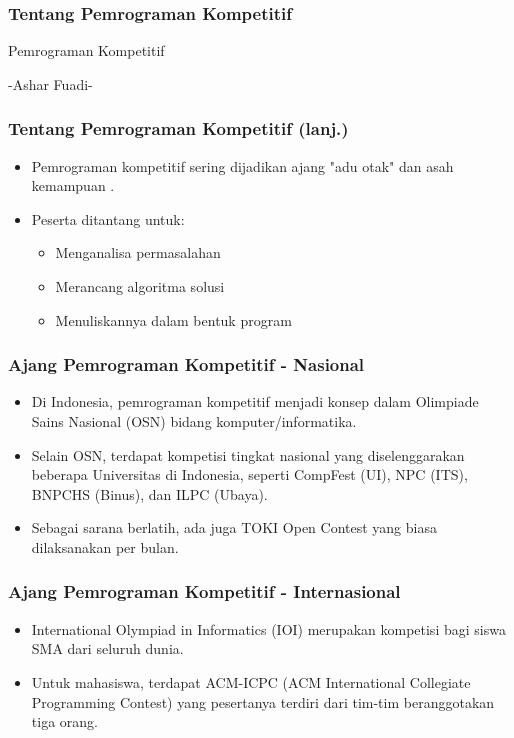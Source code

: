 \begin{frame}
\frametitle{Tentang Pemrograman Kompetitif}
\begin{block}{Pemrograman Kompetitif}

-Ashar Fuadi-
\end{block}
\end{frame}

\begin{frame}
\frametitle{Tentang Pemrograman Kompetitif (lanj.)}
\begin{itemize}
  \item Pemrograman kompetitif sering dijadikan ajang "adu otak" dan asah kemampuan .
  \item Peserta ditantang untuk:
  \begin{itemize}
    \item Menganalisa permasalahan
    \item Merancang algoritma solusi
    \item Menuliskannya dalam bentuk program
  \end{itemize}
\end{itemize}
\end{frame}

\begin{frame}
\frametitle{Ajang Pemrograman Kompetitif - Nasional}
\begin{itemize}
  \item Di Indonesia, pemrograman kompetitif menjadi konsep dalam Olimpiade Sains Nasional (OSN) bidang komputer/informatika.
  \item Selain OSN, terdapat kompetisi tingkat nasional yang diselenggarakan beberapa Universitas di Indonesia, seperti CompFest (UI), NPC (ITS), BNPCHS (Binus), dan ILPC (Ubaya).
  \item Sebagai sarana berlatih, ada juga TOKI Open Contest yang biasa dilaksanakan per bulan.
\end{itemize}
\end{frame}

\begin{frame}
\frametitle{Ajang Pemrograman Kompetitif - Internasional}
\begin{itemize}
  \item International Olympiad in Informatics (IOI) merupakan kompetisi bagi siswa SMA dari seluruh dunia.
  \item Untuk mahasiswa, terdapat ACM-ICPC (ACM International Collegiate Programming Contest) yang pesertanya terdiri dari tim-tim beranggotakan tiga orang.
\end{itemize}
\end{frame}

